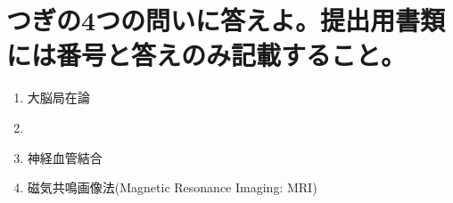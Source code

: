 \documentclass[titlepage,a4paper]{jsarticle}
\begin{document}
\section{つぎの4つの問いに答えよ。提出用書類には番号と答えのみ記載すること。}
\begin{enumerate}
  \item 大脳局在論
  \item %
  \item 神経血管結合
  \item 磁気共鳴画像法(Magnetic Resonance Imaging: MRI)
\end{enumerate}
\end{document}
